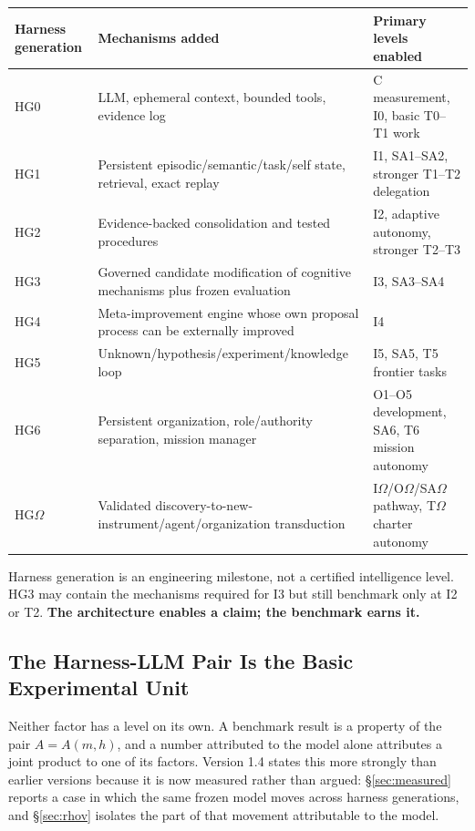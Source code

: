 \documentclass[11pt]{article}
\theoremstyle{definition}
\newcommand{\Om}{\ensuremath{\Omega}}
\begin{document}
\begin{table}[h]
\centering\small
\begin{tabularx}{\textwidth}{@{}lYY@{}}
\toprule
Harness generation & Mechanisms added & Primary levels enabled \\
\midrule
HG0 & LLM, ephemeral context, bounded tools, evidence log & C measurement, I0, basic T0--T1 work \\
HG1 & Persistent episodic/semantic/task/self state, retrieval, exact replay & I1, SA1--SA2, stronger T1--T2 delegation \\
HG2 & Evidence-backed consolidation and tested procedures & I2, adaptive autonomy, stronger T2--T3 \\
HG3 & Governed candidate modification of cognitive mechanisms plus frozen evaluation & I3, SA3--SA4 \\
HG4 & Meta-improvement engine whose own proposal process can be externally improved & I4 \\
HG5 & Unknown/hypothesis/experiment/knowledge loop & I5, SA5, T5 frontier tasks \\
HG6 & Persistent organization, role/authority separation, mission manager & O1--O5 development, SA6, T6 mission autonomy \\
HG\Om{} & Validated discovery-to-new-instrument/agent/organization transduction & I\Om{}/O\Om{}/SA\Om{} pathway, T\Om{} charter autonomy \\
\bottomrule
\end{tabularx}
\end{table}

Harness generation is an engineering milestone, not a certified intelligence level. HG3 may contain the mechanisms required for I3 but still benchmark only at I2 or T2. \textbf{The architecture enables a claim; the benchmark earns it.}

\subsection{The Harness-LLM Pair Is the Basic Experimental Unit}\label{sec:pair}

Neither factor has a level on its own. A benchmark result is a property of the pair $A = A(m,h)$, and a number attributed to the model alone attributes a joint product to one of its factors. Version 1.4 states this more strongly than earlier versions because it is now measured rather than argued: \S\ref{sec:measured} reports a case in which the same frozen model moves across harness generations, and \S\ref{sec:rhov} isolates the part of that movement attributable to the model.
\end{document}
